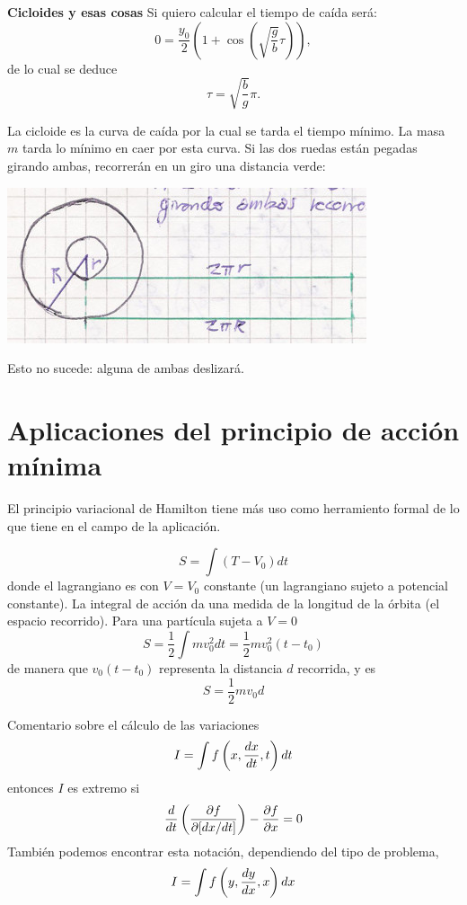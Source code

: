 \documentclass[10pt,oneside]{CBFT_book}
\begin{document}
\begin{ejemplo}{\bf Cicloides y esas cosas}
Si quiero calcular el tiempo de caída será:
\[
	0 = \frac{y_0}{2}\left( 1 + \cos ( \sqrt{ \frac g b } \tau ) \right),
\]
de lo cual se deduce 
\[
	\tau = \sqrt{ \frac b g } \pi.
\]

La cicloide es la curva de caída por la cual se tarda el tiempo mínimo. La masa $m$ tarda lo mínimo en caer por esta curva.
Si las dos ruedas están pegadas girando ambas, recorrerán en un giro una distancia verde:

\includegraphics[scale=0.2]{images/fig_mc_ruedas_pegadas.jpg}

Esto no sucede: alguna de ambas deslizará.
\end{ejemplo}




\section{Aplicaciones del principio de acción mínima}

El principio variacional de Hamilton tiene más uso como herramiento formal de lo que tiene en el campo de la aplicación.

\[
	S = \int (T-V_0) dt
\]
donde el lagrangiano es con $V=V_0$ constante (un lagrangiano sujeto a potencial constante).
La integral de acción da una medida de la longitud de la órbita (el espacio recorrido).
Para una partícula sujeta a $V=0$
\[
	S = \frac{1}{2}\int m v_0^2 dt = \frac{1}{2}mv_0^2(t-t_0)
\]
de manera que $v_0(t-t_0)$ representa la distancia $d$ recorrida, y es 
\[
	S = \frac{1}{2}mv_0 d
\]

Comentario sobre el cálculo de las variaciones
\[
	I = \int f\left(x, \frac{d^{\hspace{-0.05em}} {x}}{d {t}^{\hspace{-0.05em}}}, t\right) dt 
\]
entonces $I$ es extremo si
\[
	\frac{d}{dt} \left( \frac{\partial^{\hspace{-0.05em}} {f}}{\partial {[dx/dt]}^{\hspace{-0.05em}}}\right) - \frac{\partial^{\hspace{-0.05em}} {f}}{\partial {x}^{\hspace{-0.05em}}} = 0
\]
También podemos encontrar esta notación, dependiendo del tipo de problema,
\[
	I = \int f\left(y, \frac{d^{\hspace{-0.05em}} {y}}{d {x}^{\hspace{-0.05em}}}, x\right) dx 
\]
\end{document}
